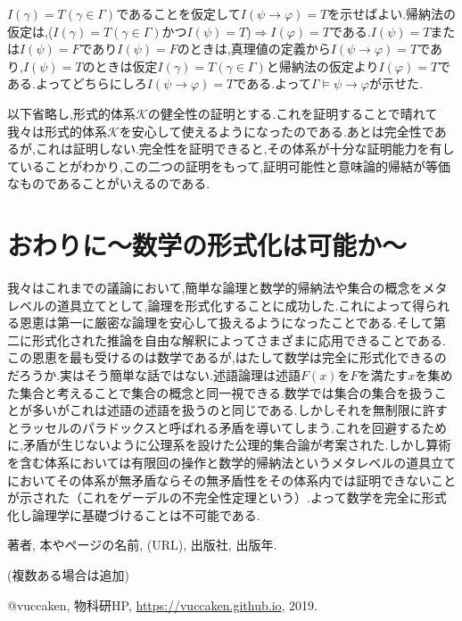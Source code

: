 \documentclass[10pt,b5paper,papersize,dvipdfmx]{jsbook}
\begin{document}
$I(\gamma)=T(\gamma \in \Gamma)$であることを仮定して$I(\psi \to \varphi)=T$を示せばよい.帰納法の仮定は,($I(\gamma)=T(\gamma \in \Gamma)$かつ$I(\psi)=T$)$\Rightarrow$$I(\varphi)=T$である.$I(\psi) = T$または$I(\psi) = F$であり$I(\psi) = F$のときは,真理値の定義から$I(\psi \to \varphi)=T$であり,$I(\psi) = T$のときは仮定$I(\gamma)=T(\gamma \in \Gamma)$と帰納法の仮定より$I(\varphi)=T$である.よってどちらにしろ$I(\psi \to \varphi)=T$である.よって$\Gamma \models \psi \to \varphi$が示せた.\par
以下省略し,形式的体系$\mathcal K$の健全性の証明とする.これを証明することで晴れて我々は形式的体系$\mathcal K$を安心して使えるようになったのである.あとは完全性であるが,これは証明しない.完全性を証明できると,その体系が十分な証明能力を有していることがわかり,この二つの証明をもって,証明可能性と意味論的帰結が等価なものであることがいえるのである.

\section{おわりに～数学の形式化は可能か～}
我々はこれまでの議論において,簡単な論理と数学的帰納法や集合の概念をメタレベルの道具立てとして,論理を形式化することに成功した.これによって得られる恩恵は第一に厳密な論理を安心して扱えるようになったことである.そして第二に形式化された推論を自由な解釈によってさまざまに応用できることである.この恩恵を最も受けるのは数学であるが,はたして数学は完全に形式化できるのだろうか.実はそう簡単な話ではない.述語論理は述語$F(x)$を$F$を満たす$x$を集めた集合と考えることで集合の概念と同一視できる.数学では集合の集合を扱うことが多いがこれは述語の述語を扱うのと同じである.しかしそれを無制限に許すとラッセルのパラドックスと呼ばれる矛盾を導いてしまう.これを回避するために,矛盾が生じないように公理系を設けた公理的集合論が考案された.しかし算術を含む体系においては有限回の操作と数学的帰納法というメタレベルの道具立てにおいてその体系が無矛盾ならその無矛盾性をその体系内では証明できないことが示された（これをゲーデルの不完全性定理という）.よって数学を完全に形式化し論理学に基礎づけることは不可能である.

\begin{thebibliography}{99}
  \item 著者, 本やページの名前, (URL), 出版社, 出版年.
  \item (複数ある場合は追加)
  \item @vuccaken, 物科研HP, \url{https://vuccaken.github.io}, 2019.
\end{thebibliography}
\end{document}
